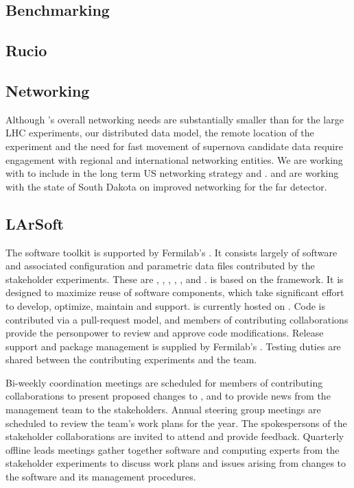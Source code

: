\documentclass[../main-v1.tex]{subfiles}
\begin{document}
\subsection{Benchmarking }
\subsection{Rucio }
\subsection{Networking} 
Although 's overall networking needs are substantially smaller than for the large LHC experiments, our distributed data model, the remote location of the experiment and the need for fast movement of supernova candidate data require engagement with regional and international networking entities. 
We are working with  to include  in the long term US networking strategy\cite{osti_1804717} and .    and  are working with the state of South Dakota on improved networking for the far detector. 

\subsection{LArSoft }
The  software toolkit is supported by Fermilab's .  It consists largely of software and associated configuration and parametric data files contributed by the stakeholder experiments.  These are , , , , , and .   is based on the  framework.  It is designed to maximize reuse of software components, which take significant effort to develop, optimize, maintain and support.   is currently hosted on .  Code is contributed via a pull-request model, and members of contributing collaborations provide the personpower to review and approve code modifications.  Release support and package management is supplied by Fermilab's .  Testing duties are shared between the contributing experiments and the  team.  

Bi-weekly  coordination meetings are scheduled for members of contributing collaborations to present proposed changes to , and to provide news from the management team to the stakeholders.  Annual  steering group meetings are scheduled to review the  team's work plans for the year.  The spokespersons of the stakeholder collaborations are invited to attend and provide feedback.  Quarterly  offline leads meetings gather together software and computing experts from the stakeholder experiments to discuss work plans and issues arising from changes to the software and its management procedures.
\end{document}
